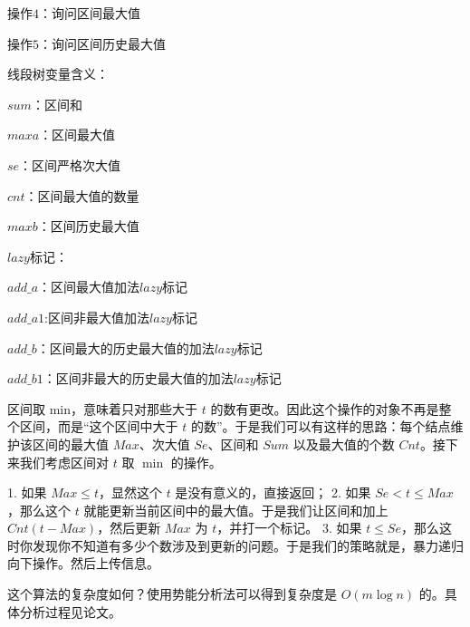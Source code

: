 \documentclass[12pt]{article}
\begin{document}
{{{{{{{{{{{{{操作$4$：询问区间最大值

操作$5$：询问区间历史最大值

线段树变量含义：

$sum$：区间和

$maxa$：区间最大值

$se$：区间严格次大值

$cnt$：区间最大值的数量

$maxb$：区间历史最大值

$lazy$标记：

$add\_a$：区间最大值加法$lazy$标记

$add\_a1$:区间非最大值加法$lazy$标记

$add\_b$：区间最大的历史最大值的加法$lazy$标记

$add\_b1$：区间非最大的历史最大值的加法$lazy$标记

区间取 min，意味着只对那些大于 $t$ 的数有更改。因此这个操作的对象不再是整个区间，而是“这个区间中大于 $t$ 的数”。于是我们可以有这样的思路：每个结点维护该区间的最大值 $Max$、次大值 $Se$、区间和 $Sum$ 以及最大值的个数 $Cnt$。接下来我们考虑区间对 $t$ 取 $\min$ 的操作。

1. 如果 $Max\le t$，显然这个 $t$ 是没有意义的，直接返回；
2. 如果 $Se<t\le Max$，那么这个 $t$ 就能更新当前区间中的最大值。于是我们让区间和加上 $Cnt(t-Max)$，然后更新 $Max$ 为 $t$，并打一个标记。
3. 如果 $t\le Se$，那么这时你发现你不知道有多少个数涉及到更新的问题。于是我们的策略就是，暴力递归向下操作。然后上传信息。

这个算法的复杂度如何？使用势能分析法可以得到复杂度是 $O(m\log n)$ 的。具体分析过程见论文。

}}}}}}}}}}}}}
\end{document}
